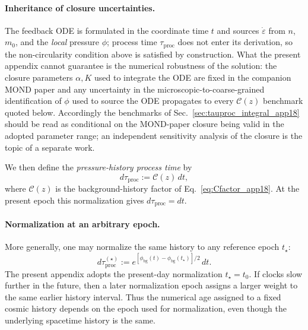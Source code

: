 \documentclass[11pt]{article}
\begin{document}
\paragraph{Inheritance of closure uncertainties.}
The feedback ODE is formulated in the coordinate time $t$ and sources
$\dot\varepsilon$ from $n$, $m_0$, and the \emph{local} pressure
$\phi$; process time $\tau_{\mathrm{proc}}$ does not enter its
derivation, so the non-circularity condition above is satisfied by
construction.  What the present appendix cannot guarantee is the
numerical robustness of the solution: the closure parameters
$\alpha,K$ used to integrate the ODE are fixed in the companion MOND
paper and any uncertainty in the microscopic-to-coarse-grained
identification of $\phi$ used to source the ODE propagates to every
$\mathcal{C}(z)$ benchmark quoted below.  Accordingly the benchmarks of
Sec.~\ref{sec:tauproc_integral_app18} should be read as conditional on
the MOND-paper closure being valid in the adopted parameter range;
an independent sensitivity analysis of the closure is the topic of a
separate work.

\medskip

We then define the \emph{pressure-history process time} by
\begin{equation}
  d\tau_{\mathrm{proc}}
  := \mathcal{C}(z)\,dt,
  \label{eq:tauproc_def}
\end{equation}
where $\mathcal{C}(z)$ is the background-history factor of
Eq.~\eqref{eq:Cfactor_app18}.
At the present epoch this normalization gives
$d\tau_{\mathrm{proc}}=dt$.

\paragraph{Normalization at an arbitrary epoch.}
More generally, one may normalize the same history to any reference epoch
$t_\star$:
\begin{equation}
  d\tau_{\mathrm{proc}}^{(\star)}
  := e^{[\phi_{\mathrm{bg}}(t)-\phi_{\mathrm{bg}}(t_\star)]/2}\,dt.
  \label{eq:tauproc_star}
\end{equation}
The present appendix adopts the present-day normalization $t_\star=t_0$.
If clocks slow further in the future, then a later normalization epoch
assigns a larger weight to the same earlier history interval.  Thus the
numerical age assigned to a fixed cosmic history depends on the epoch used
for normalization, even though the underlying spacetime history is the same.
\end{document}

